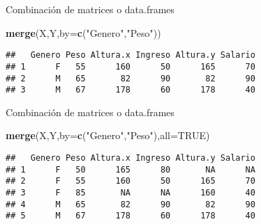 \documentclass[ignorenonframetext,]{beamer}
\newenvironment{Shaded}{\begin{snugshade}}{\end{snugshade}}
\newcommand{\KeywordTok}[1]{\textcolor[rgb]{0.13,0.29,0.53}{\textbf{#1}}}
\newcommand{\DataTypeTok}[1]{\textcolor[rgb]{0.13,0.29,0.53}{#1}}
\newcommand{\StringTok}[1]{\textcolor[rgb]{0.31,0.60,0.02}{#1}}
\newcommand{\OtherTok}[1]{\textcolor[rgb]{0.56,0.35,0.01}{#1}}
\newcommand{\NormalTok}[1]{#1}
\begin{document}
\begin{frame}[fragile]{Combinación de matrices o data.frames}

\begin{Shaded}
\begin{Highlighting}[]
\KeywordTok{merge}\NormalTok{(X,Y,}\DataTypeTok{by=}\KeywordTok{c}\NormalTok{(}\StringTok{"Genero"}\NormalTok{,}\StringTok{"Peso"}\NormalTok{))}
\end{Highlighting}
\end{Shaded}

\begin{verbatim}
##   Genero Peso Altura.x Ingreso Altura.y Salario
## 1      F   55      160      50      165      70
## 2      M   65       82      90       82      90
## 3      M   67      178      60      178      40
\end{verbatim}

\end{frame}

\begin{frame}[fragile]{Combinación de matrices o data.frames}

\begin{Shaded}
\begin{Highlighting}[]
\KeywordTok{merge}\NormalTok{(X,Y,}\DataTypeTok{by=}\KeywordTok{c}\NormalTok{(}\StringTok{"Genero"}\NormalTok{,}\StringTok{"Peso"}\NormalTok{),}\DataTypeTok{all=}\OtherTok{TRUE}\NormalTok{)}
\end{Highlighting}
\end{Shaded}

\begin{verbatim}
##   Genero Peso Altura.x Ingreso Altura.y Salario
## 1      F   50      165      80       NA      NA
## 2      F   55      160      50      165      70
## 3      F   85       NA      NA      160      40
## 4      M   65       82      90       82      90
## 5      M   67      178      60      178      40
\end{verbatim}

\end{frame}
\end{document}
